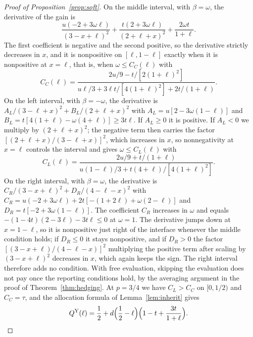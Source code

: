\documentclass[sigconf,anonymous,review]{acmart}
\numberwithin{equation}{section}
\newcommand{\QY}{Q^{\mathrm{Y}}}
\begin{document}
\begin{proof}[Proof of Proposition~\ref{prop:soft}]
On the middle interval, with $\beta=\omega$, the derivative of the gain is
\[
\frac{u(-2+3\omega\ell)}{(3-x+\ell)^2}+\frac{t(2+3\omega\ell)}{(2+\ell+x)^2}+\frac{2\omega t}{1+\ell}.
\]
The first coefficient is negative and the second positive, so the derivative
strictly decreases in $x$, and it is nonpositive on $[\ell,1-\ell]$ exactly when
it is nonpositive at $x=\ell$, that is, when $\omega\le C_C(\ell)$ with
\[
C_C(\ell)=\frac{2u/9-t/[2(1+\ell)^2]}{u\ell/3+3\ell t/[4(1+\ell)^2]+2t/(1+\ell)} .
\]
On the left interval, with $\beta=-\omega$, the derivative is
$A_L/(3-\ell+x)^2+B_L/(2+\ell+x)^2$ with $A_L=u[2-3\omega(1-\ell)]$ and
$B_L=t[4(1+\ell)-\omega(4+\ell)]\ge3t\ell$. If $A_L\ge0$ it is positive. If
$A_L<0$ we multiply by $(2+\ell+x)^2$; the negative term then carries the factor
$[(2+\ell+x)/(3-\ell+x)]^2$, which increases in $x$, so nonnegativity at
$x=\ell$ controls the interval and gives $\omega\le C_L(\ell)$ with
\[
C_L(\ell)=\frac{2u/9+t/(1+\ell)}{u(1-\ell)/3+t(4+\ell)/[4(1+\ell)^2]} .
\]
On the right interval, with $\beta=\omega$, the derivative is
$C_R/(3-x+\ell)^2+D_R/(4-\ell-x)^2$ with
$C_R=u(-2+3\omega\ell)+2t[-(1+2\ell)+\omega(2-\ell)]$ and
$D_R=t[-2+3\omega(1-\ell)]$. The coefficient $C_R$ increases in $\omega$ and
equals $-(1-4t)(2-3\ell)-3t\ell\le0$ at $\omega=1$. The derivative jumps down at
$x=1-\ell$, so it is nonpositive just right of the interface whenever the
middle condition holds; if $D_R\le0$ it stays nonpositive, and if $D_R>0$ the
factor $[(3-x+\ell)/(4-\ell-x)]^2$ multiplying the positive term after scaling
by $(3-x+\ell)^2$ decreases in $x$, which again keeps the sign. The right
interval therefore adds no condition. With free evaluation, skipping the
evaluation does not pay once the reporting conditions hold, by the averaging
argument in the proof of Theorem~\ref{thm:hedging}. At $p=3/4$ we have
$C_L>C_C$ on $[0,1/2)$ and $C_C=\tau$, and the allocation formula of
Lemma~\ref{lem:inherit} gives
\[
\QY(\ell)=\frac12+d\Bigl(\frac12-\ell\Bigr)\Bigl(1-t+\frac{3t}{1+\ell}\Bigr).\qedhere
\]
\end{proof}
\end{document}
